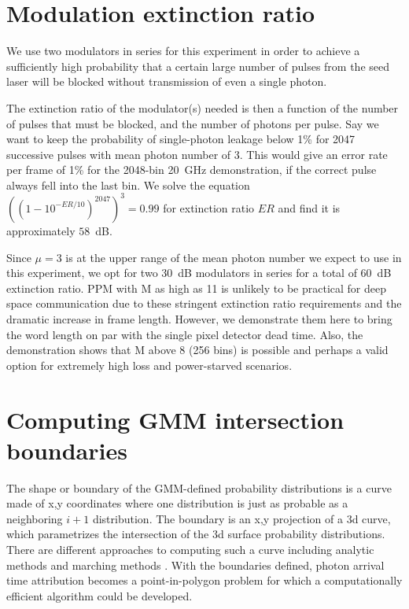 \documentclass[11pt]{caltech_thesis} %
\begin{document}
\hypertarget{modulation-extinction-ratio}{%
\section{Modulation extinction ratio}\label{modulation-extinction-ratio}}

We use two modulators in series for this experiment in order to achieve a sufficiently high probability that a certain large number of pulses from the seed laser will be blocked without transmission of even a single photon.

The extinction ratio of the modulator(s) needed is then a function of the number of pulses that must be blocked, and the number of photons per pulse. Say we want to keep the probability of single-photon leakage below 1\% for 2047 successive pulses with mean photon number of 3. This would give an error rate per frame of 1\% for the 2048-bin 20~GHz demonstration, if the correct pulse always fell into the last bin. We solve the equation $((1 - 10^{-ER/10})^{2047})^3 = 0.99$ for extinction ratio $ER$ and find it is approximately $58$~dB.

Since $\mu=3$ is at the upper range of the mean photon number we expect to use in this experiment, we opt for two 30~dB modulators in series for a total of 60~dB extinction ratio. PPM with M as high as 11 is unlikely to be practical for deep space communication due to these stringent extinction ratio requirements and the dramatic increase in frame length. However, we demonstrate them here to bring the word length on par with the single pixel detector dead time. Also, the demonstration shows that M above 8 (256 bins) is possible and perhaps a valid option for extremely high loss and power-starved scenarios.

\hypertarget{computing-gmm-intersection-boundaries}{%
\section{Computing GMM intersection boundaries}\label{computing-gmm-intersection-boundaries}}

The shape or boundary of the GMM-defined probability distributions is a curve made of x,y coordinates where one distribution is just as probable as a neighboring $i+1$ distribution. The boundary is an x,y projection of a 3d curve, which parametrizes the intersection of the 3d surface probability distributions. There are different approaches to computing such a curve including analytic methods and marching methods \autocite{Bajaj1988,Shankar1997}. With the boundaries defined, photon arrival time attribution becomes a point-in-polygon problem for which a computationally efficient algorithm could be developed.
\end{document}
